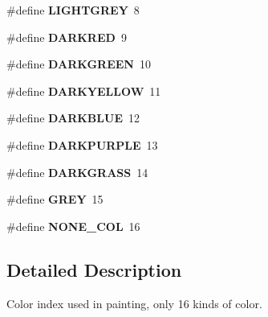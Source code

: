\begin{DoxyCompactItemize}
\item 
\hypertarget{group__palette_gad6f956656202c51eba717eb306602871}{}\#define {\bfseries L\+I\+G\+H\+T\+G\+R\+E\+Y}~8\label{group__palette_gad6f956656202c51eba717eb306602871}

\item 
\hypertarget{group__palette_ga963a09a681f27b9562bd1ae1c7bf21ac}{}\#define {\bfseries D\+A\+R\+K\+R\+E\+D}~9\label{group__palette_ga963a09a681f27b9562bd1ae1c7bf21ac}

\item 
\hypertarget{group__palette_ga417b60720dd3d179e06f7efecca21123}{}\#define {\bfseries D\+A\+R\+K\+G\+R\+E\+E\+N}~10\label{group__palette_ga417b60720dd3d179e06f7efecca21123}

\item 
\hypertarget{group__palette_gad615861fcf74cefcd06f217cfdc4c60d}{}\#define {\bfseries D\+A\+R\+K\+Y\+E\+L\+L\+O\+W}~11\label{group__palette_gad615861fcf74cefcd06f217cfdc4c60d}

\item 
\hypertarget{group__palette_gaa1cb63adface880613149574fc26069c}{}\#define {\bfseries D\+A\+R\+K\+B\+L\+U\+E}~12\label{group__palette_gaa1cb63adface880613149574fc26069c}

\item 
\hypertarget{group__palette_gabe1981b0fbcc50f7d519265b4be45aca}{}\#define {\bfseries D\+A\+R\+K\+P\+U\+R\+P\+L\+E}~13\label{group__palette_gabe1981b0fbcc50f7d519265b4be45aca}

\item 
\hypertarget{group__palette_gadf9e2882be6e1241f7ff4b43ed8e4932}{}\#define {\bfseries D\+A\+R\+K\+G\+R\+A\+S\+S}~14\label{group__palette_gadf9e2882be6e1241f7ff4b43ed8e4932}

\item 
\hypertarget{group__palette_gadce122f566c88a1eceeb79a635afa964}{}\#define {\bfseries G\+R\+E\+Y}~15\label{group__palette_gadce122f566c88a1eceeb79a635afa964}

\item 
\hypertarget{group__palette_ga0e65d9c3f578acfc5f9209eaf934b5c9}{}\#define {\bfseries N\+O\+N\+E\+\_\+\+C\+O\+L}~16\label{group__palette_ga0e65d9c3f578acfc5f9209eaf934b5c9}

\end{DoxyCompactItemize}


\subsection{Detailed Description}
Color index used in painting, only 16 kinds of color. 

